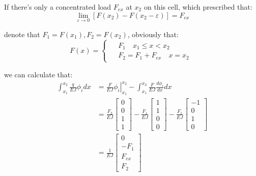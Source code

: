 If there's only a concentrated load $F_{ex}$ at $x_2$ on this cell, which prescribed that:
\begin{equation}
    \lim_{\varepsilon\to0}
    \left[
        F(x_2) - F(x_2-\varepsilon)
    \right]
    =F_{ex}
\end{equation}

denote that $F_1=F(x_1),F_2=F(x_2)$, obviously that:
\begin{equation}
    F(x)=
    \begin{cases}
        \begin{aligned}
            &F_1 \quad x_1\leq x < x_2\\
            &F_2=F_1 + F_{ex} \quad x=x_2
        \end{aligned}
    \end{cases}
\end{equation}

we can calculate that:
\begin{equation}
    \begin{aligned}
        \int_{x_1}^{x_2}
        \frac{q}{EJ}\phi_i
        dx
        &=
        \left.
        \frac{F}{EJ}\phi_i
        \right|_{x_1}^{x_2}-
        \int_{x_1}^{x_2}
        \frac{F}{EJ}\frac{d\phi_i}{dx}
        dx\\
        &=
        \frac{F_2}{EJ}
        \begin{bmatrix}
            0\\0\\1\\1
        \end{bmatrix}
        -
        \frac{F_1}{EJ}
        \begin{bmatrix}
            1\\1\\0\\0
        \end{bmatrix}
        -\frac{F_1}{EJ}
        \begin{bmatrix}
            -1\\0\\1\\0
        \end{bmatrix}\\
        &=
        \frac{1}{EJ}
        \begin{bmatrix}
            0\\
            -F_1\\
            F_{ex}\\
            F_2
        \end{bmatrix}
    \end{aligned}
\end{equation}

